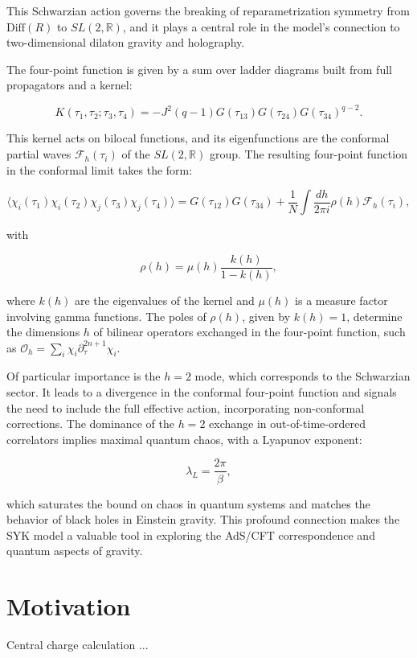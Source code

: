 This Schwarzian action governs the breaking of reparametrization symmetry from $\text{Diff}(R)$ to $SL(2, \mathbb{R})$, and it plays a central role in the model's connection to two-dimensional dilaton gravity and holography.

The four-point function is given by a sum over ladder diagrams built from full propagators and a kernel:

$$
K(\tau_1, \tau_2; \tau_3, \tau_4) = -J^2 (q-1) G(\tau_{13}) G(\tau_{24}) G(\tau_{34})^{q-2}.
$$

This kernel acts on bilocal functions, and its eigenfunctions are the conformal partial waves $\mathcal{F}_h(\tau_i)$ of the $SL(2, \mathbb{R})$ group. The resulting four-point function in the conformal limit takes the form:

$$
\langle \chi_i(\tau_1) \chi_i(\tau_2) \chi_j(\tau_3) \chi_j(\tau_4) \rangle = G(\tau_{12})G(\tau_{34}) + \frac{1}{N} \int \frac{dh}{2\pi i} \rho(h) \mathcal{F}_h(\tau_i),
$$

with

$$
\rho(h) = \mu(h) \frac{k(h)}{1 - k(h)},
$$

where $k(h)$ are the eigenvalues of the kernel and $\mu(h)$ is a measure factor involving gamma functions. The poles of $\rho(h)$, given by $k(h) = 1$, determine the dimensions $h$ of bilinear operators exchanged in the four-point function, such as $\mathcal{O}_h = \sum_i \chi_i \partial_\tau^{2n+1} \chi_i$.

Of particular importance is the $h = 2$ mode, which corresponds to the Schwarzian sector. It leads to a divergence in the conformal four-point function and signals the need to include the full effective action, incorporating non-conformal corrections. The dominance of the $h = 2$ exchange in out-of-time-ordered correlators implies maximal quantum chaos, with a Lyapunov exponent:

$$
\lambda_L = \frac{2\pi}{\beta},
$$

which saturates the bound on chaos in quantum systems and matches the behavior of black holes in Einstein gravity. This profound connection makes the SYK model a valuable tool in exploring the AdS/CFT correspondence and quantum aspects of gravity.


\section{Motivation}

{\color{red} Central charge calculation ...}

%
%
